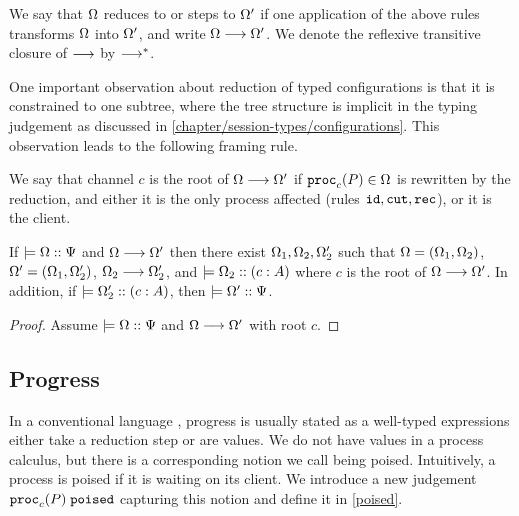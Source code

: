 We say that $\Omega$ reduces to or steps to $\Omega'$ if one application of the above rules transforms $\Omega$ into $\Omega'$, and write $\Omega \longrightarrow \Omega'$. We denote the reflexive transitive closure of $\longrightarrow$ by $\longrightarrow^*$.

One important observation about reduction of typed configurations is that it is constrained to one subtree, where the tree structure is implicit in the typing judgement as discussed in \cref{chapter/session-types/configurations}. This observation leads to the following framing rule.

\begin{definition} We say that channel $c$ is the root of $\Omega \longrightarrow \Omega'$ if $\mathtt{proc}_{c}(P) \in \Omega$ is rewritten by the reduction, and either it is the only process affected (rules $\texttt{id}, \texttt{cut}, \texttt{rec}$), or it is the client.
\end{definition}

\begin{lemma}[Framing]
  \label{framing}
  If $\models {\Omega} :: {\Psi}$ and $\Omega \longrightarrow \Omega'$ then there exist $\Omega_1, \Omega_2, \Omega_2'$ such that $\Omega = (\Omega_1, \Omega_2)$, $\Omega' = (\Omega_1, \Omega_2')$, $\Omega_2 \longrightarrow \Omega_2'$, and $\models {\Omega_2} :: ({c} : {A})$ where $c$ is the root of $\Omega \longrightarrow \Omega'$. In addition, if $\models {\Omega_2'} :: ({c} : {A})$, then $\models {\Omega'} :: {\Psi}$.
\end{lemma}

\begin{proof}
  Assume $\models {\Omega} :: {\Psi}$ and $\Omega \longrightarrow \Omega'$ with root $c$.
\end{proof}


\subsection{Progress}

In a conventional language , progress is usually stated as a well-typed expressions either take a reduction step or are values. We do not have values in a process calculus, but there is a corresponding notion we call being poised. Intuitively, a process is poised if it is waiting on its client. We introduce a new judgement $\mathtt{proc}_{c}(P)\;\mathtt{poised}$ capturing this notion and define it in \cref{poised}. 


